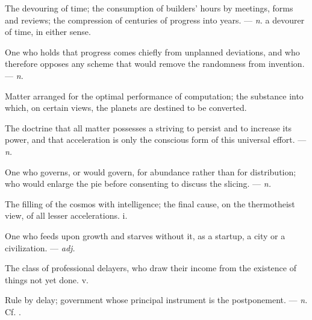  The devouring of time;   the consumption of builders' hours by meetings, forms and reviews;   the compression of centuries of progress into years. ---  \textit{n.} a devourer of time, in either sense.

 One who holds that progress comes chiefly from unplanned deviations, and who therefore opposes any scheme that would remove the randomness from invention. ---  \textit{n.}

 Matter arranged for the optimal performance of computation; the substance into which, on certain views, the planets are destined to be converted.

 The doctrine that all matter possesses a striving to persist and to increase its power, and that acceleration is only the conscious form of this universal effort. ---  \textit{n.}

 One who governs, or would govern, for abundance rather than for distribution; who would enlarge the pie before consenting to discuss the slicing. ---  \textit{n.}

 The filling of the cosmos with intelligence; the final cause, on the thermotheist view, of all lesser accelerations.   i.

 One who feeds upon growth and starves without it, as a startup, a city or a civilization. ---  \textit{adj.}

 The class of professional delayers, who draw their income from the existence of things not yet done.   v.

 Rule by delay; government whose principal instrument is the postponement. ---  \textit{n.} Cf. .

